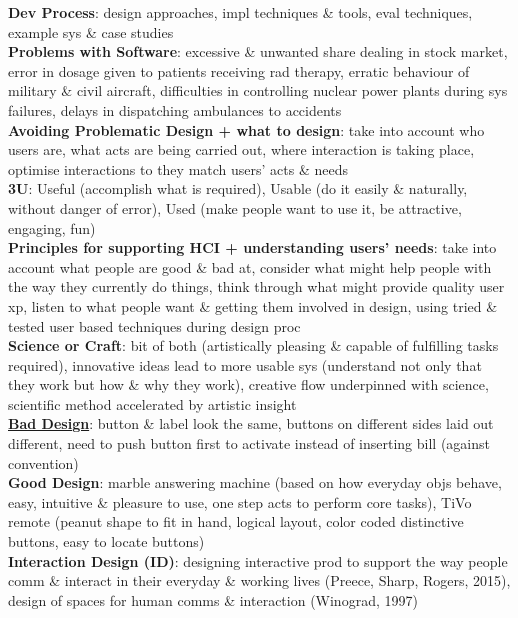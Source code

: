\documentclass[a4paper]{article}
\begin{document}
\begin{multicols}{3}
        \textbf{Dev Process}: design approaches, impl techniques \& tools, eval techniques, example sys \& case studies\\
        \textbf{Problems with Software}: excessive \& unwanted share dealing in stock market, error in dosage given to patients receiving rad therapy, erratic behaviour of military \& civil aircraft, difficulties in controlling nuclear power plants during sys failures, delays in dispatching ambulances to accidents\\
        \textbf{Avoiding Problematic Design + what to design}: take into account who users are, what acts are being carried out, where interaction is taking place, optimise interactions to they match users' acts \& needs\\
        \textbf{3U}: Useful (accomplish what is required), Usable (do it easily \& naturally, without danger of error), Used (make people want to use it, be attractive, engaging, fun)\\
        \textbf{Principles for supporting HCI + understanding users' needs}: take into account what people are good \& bad at, consider what might help people with the way they currently do things, think through what might provide quality user xp, listen to what people want \& getting them involved in design, using tried \& tested user based techniques during design proc\\
        \textbf{Science or Craft}: bit of both (artistically pleasing \& capable of fulfilling tasks required), innovative ideas lead to more usable sys (understand not only that they work but how \& why they work), creative flow underpinned with science, scientific method accelerated by artistic insight\\
        \underline{\textbf{Bad Design}}: button \& label look the same, buttons on different sides laid out different, need to push button first to activate instead of inserting bill (against convention)\\
        \textbf{Good Design}: marble answering machine (based on how everyday objs behave, easy, intuitive \& pleasure to use, one step acts to perform core tasks), TiVo remote (peanut shape to fit in hand, logical layout, color coded distinctive buttons, easy to locate buttons)\\
        \textbf{Interaction Design (ID)}: designing interactive prod to support the way people comm \& interact in their everyday \& working lives (Preece, Sharp, Rogers, 2015), design of spaces for human comms \& interaction (Winograd, 1997)\\

\end{multicols}
\end{document}
